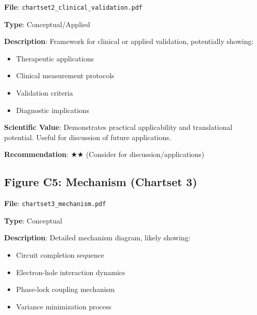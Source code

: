 \documentclass[11pt]{article}
\begin{document}

\textbf{File}: \texttt{chartset2\_clinical\_validation.pdf}

\textbf{Type}: Conceptual/Applied

\textbf{Description}:
Framework for clinical or applied validation, potentially showing:
\begin{itemize}
\item Therapeutic applications
\item Clinical measurement protocols
\item Validation criteria
\item Diagnostic implications
\end{itemize}

\textbf{Scientific Value}:
Demonstrates practical applicability and translational potential. Useful for discussion of future applications.

\textbf{Recommendation}: $\bigstar\bigstar$ (Consider for discussion/applications)

\subsection{Figure C5: Mechanism (Chartset 3)}


\textbf{File}: \texttt{chartset3\_mechanism.pdf}

\textbf{Type}: Conceptual

\textbf{Description}:
Detailed mechanism diagram, likely showing:
\begin{itemize}
\item Circuit completion sequence
\item Electron-hole interaction dynamics
\item Phase-lock coupling mechanism
\item Variance minimization process
\end{itemize}
\end{document}
